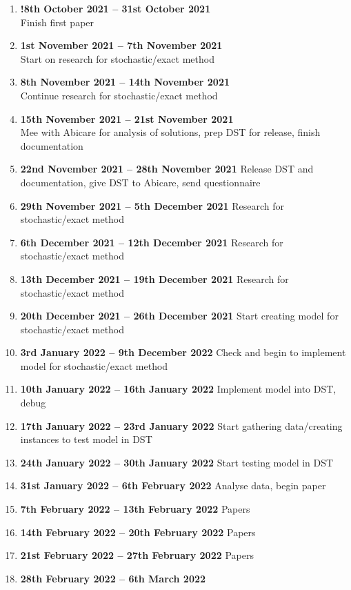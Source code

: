 \documentclass[a4paper]{article}
\begin{document}
\begin{enumerate}[leftmargin=*]
	\item \textbf{!8th October 2021 -- 31st October 2021}\\
	Finish first paper
	\item \textbf{1st November 2021 -- 7th November 2021}\\
	Start on research for stochastic/exact method
	\item \textbf{8th November 2021 -- 14th November 2021}\\
	Continue research for stochastic/exact method
	\item \textbf{15th November 2021 -- 21st November 2021}\\
	Mee with Abicare for analysis of solutions, prep DST for release, finish documentation
	\item \textbf{22nd November 2021 -- 28th November 2021}
	Release DST and documentation, give DST to Abicare, send questionnaire
	\item \textbf{29th November 2021 -- 5th December 2021}
	Research for stochastic/exact method
	\item \textbf{6th December 2021 -- 12th December 2021}
	Research for stochastic/exact method
	\item \textbf{13th December 2021 -- 19th December 2021}
	Research for stochastic/exact method
	\item \textbf{20th December 2021 -- 26th December 2021}
	Start creating model for stochastic/exact method
	\item \textbf{3rd January 2022 -- 9th December 2022}
	Check and begin to implement model for stochastic/exact method
	\item \textbf{10th January 2022 -- 16th January 2022}
	Implement model into DST, debug
	\item \textbf{17th January 2022 -- 23rd January 2022}
	Start gathering data/creating instances to test model in DST
	\item \textbf{24th January 2022 -- 30th January 2022}
	Start testing model in DST
	\item \textbf{31st January 2022 -- 6th February 2022}
	Analyse data, begin paper
	\item \textbf{7th February 2022 -- 13th February 2022}
	Papers
	\item \textbf{14th February 2022 -- 20th February 2022}
	Papers
	\item \textbf{21st February 2022 -- 27th February 2022}
	Papers
	\item \textbf{28th February 2022 -- 6th March 2022}

\end{enumerate}
\end{document}
